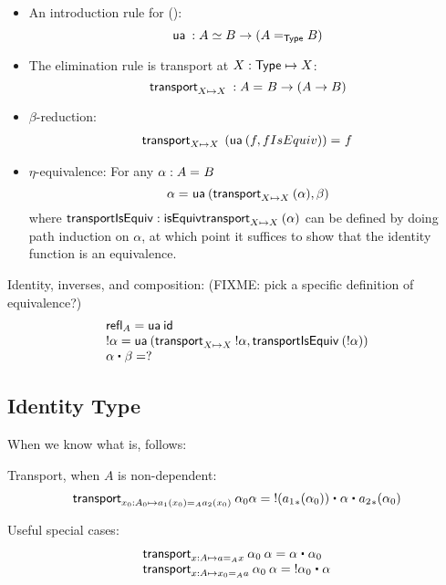 \begin{itemize}
\item An introduction rule for {()}:
  \[
  \ua{} : {\eqv A B} \to (\id[\type]{A}{B})
  \]
\item The elimination rule is transport at $X:\type \mapsto X$:
  \[
  \transport{X \mapsto X}{} : \id{A}{B} \to (A \to B)
  \]
\item $\beta$-reduction: 
  \[
  \begin{array}{l}
  \id{\transport{X \mapsto X} \: (\ua {(f, fIsEquiv)})}{f}
  \end{array}
  \]
\item $\eta$-equivalence: For any $\alpha : \id A B$
  \[
  \id{\alpha}{\ua {(\transport{X \mapsto X}(\alpha) , \beta)}}
  \]
  where $\mathsf{transportIsEquiv} : \isequiv{\transport{X \mapsto X}(\alpha)}$ can be
  defined by doing path induction on $\alpha$, at which point it
  suffices to show that the identity function is an equivalence.  
\end{itemize}

Identity, inverses, and composition: (FIXME: pick a specific definition
of equivalence?)
\[
\begin{array}{l}
\refl{A} = \ua{\idfunc} \\
\opp{\alpha} = \ua {(\transport {X \mapsto X} {\opp \alpha}, \mathsf{transportIsEquiv} \: (\opp \alpha))} \\ 
{\alpha} \ct \beta = ? \\
\end{array}
\]

\subsection{Identity Type}

When we know what \id[A]{}{} is, \id[ {\id[A]{}{}} ]{}{} follows:

Transport, when $A$ is non-dependent:
\[
\begin{array}{l}
\transport{x_0:A_0 \mapsto \id[A] {a_1(x_0)}{a_2(x_0)}} {\alpha_0}{\alpha} = 
\opp{(\map{a_1}{\alpha_0})} \ct \alpha \ct \map{a_2}{\alpha_0}
\end{array}
\]

Useful special cases:
\[
\begin{array}{l}
\transport{x:A \mapsto \id[A] {a}{x}} {\alpha_0} \: {\alpha} = \alpha \ct \alpha_0 \\
\transport{x:A \mapsto \id[A] {x_0}{a}} {\alpha_0} \: {\alpha} = \opp {\alpha_0} \ct \alpha \\
\end{array}
\]

